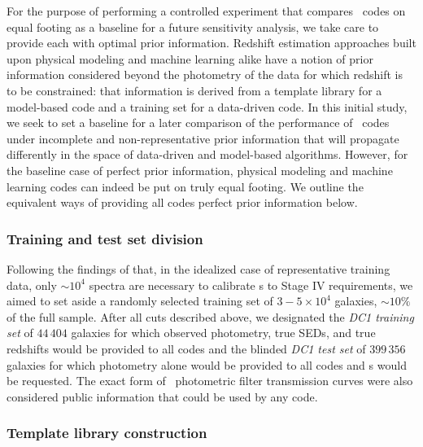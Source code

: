 For the purpose of performing a controlled experiment that compares \pzpdf\ codes on equal footing as a baseline for a future sensitivity analysis, we take care to provide each with optimal prior information.
Redshift estimation approaches built upon physical modeling and machine learning alike have a notion of prior information considered beyond the photometry of the data for which redshift is to be constrained: that information is derived from a template library for a model-based code and a training set for a data-driven code.
In this initial study, we seek to set a baseline for a later comparison of the performance of \pzpdf\ codes under incomplete and non-representative prior information that will propagate differently in the space of data-driven and model-based algorithms.
However, for the baseline case of perfect prior information, physical modeling and machine learning codes can indeed be put on truly equal footing.
We outline the equivalent ways of providing all codes perfect prior information below.

\subsubsection{Training and test set division}

Following the findings of \citet{bernstein_catastrophic_2010, newman_spectroscopic_2015, masters_mapping_2015} that, in the idealized case of representative training data, only $\sim\!10^{4}$ spectra are necessary to calibrate \pz s to Stage IV requirements, we aimed to set aside a randomly selected training set of $3-5\times 10^{4}$ galaxies, $\sim 10\%$ of the full sample.
After all cuts described above, we designated the \textit{DC1 training set} of $44\,404$ galaxies for which observed photometry, true SEDs, and true redshifts would be provided to all codes and the blinded \textit{DC1 test set} of $399\,356$ galaxies for which photometry alone would be provided to all codes and \pzpdf s would be requested.
The exact form of \lsst\ photometric filter transmission curves were also considered public information that could be used by any code.

\subsubsection{Template library construction}

